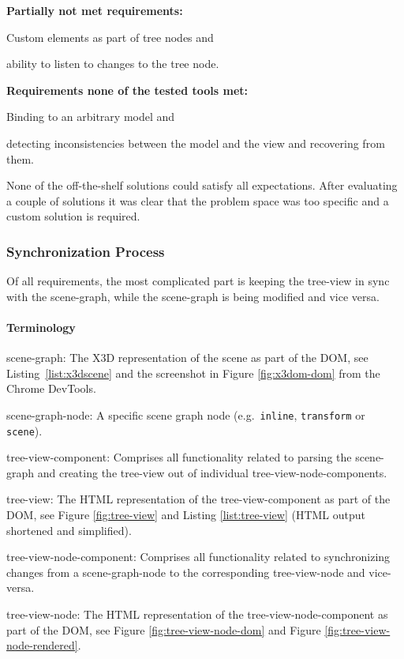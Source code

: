 \textbf{Partially not met requirements:}

\begin{itemize*}
  \item Custom elements as part of tree nodes and
  \item ability to listen to changes to the tree node.
\end{itemize*}

\textbf{Requirements none of the tested tools met:}

\begin{itemize*}
  \item Binding to an arbitrary model and
  \item detecting inconsistencies between the model and the view and recovering from them.
\end{itemize*}

None of the off-the-shelf solutions could satisfy all expectations. After
evaluating a couple of solutions it was clear that the problem space was too
specific and a custom solution is required.

\subsubsection{Synchronization Process}

Of all requirements, the most complicated part is keeping the tree-view in sync
with the scene-graph, while the scene-graph is being modified and vice
versa.

\paragraph{Terminology}
\label{terminology}

\begin{description*}
  \item[scene-graph:]
    The \gls{X3D} representation of the scene as part of the \gls{DOM}, see Listing~\ref{list:x3dscene} and the screenshot in Figure \ref{fig:x3dom-dom} from the Chrome DevTools.
  \item[scene-graph-node:]
    A specific scene graph node (e.g.~\texttt{inline}, \texttt{transform} or \texttt{scene}).
  \item[tree-view-component:]
    Comprises all functionality related to parsing the scene-graph and creating the tree-view out of individual tree-view-node-components.
  \item[tree-view:]
    The \gls{HTML} representation of the tree-view-component as part of the \gls{DOM}, see Figure \ref{fig:tree-view} and Listing \ref{list:tree-view} (\gls{HTML} output
    shortened and simplified).
  \item[tree-view-node-component:]
    Comprises all functionality related to synchronizing changes from a scene-graph-node to the corresponding
    tree-view-node and vice-versa.
  \item[tree-view-node:]
    The \gls{HTML} representation of the tree-view-node-component as part of the \gls{DOM}, see Figure \ref{fig:tree-view-node-dom} and Figure \ref{fig:tree-view-node-rendered}.
\end{description*}

